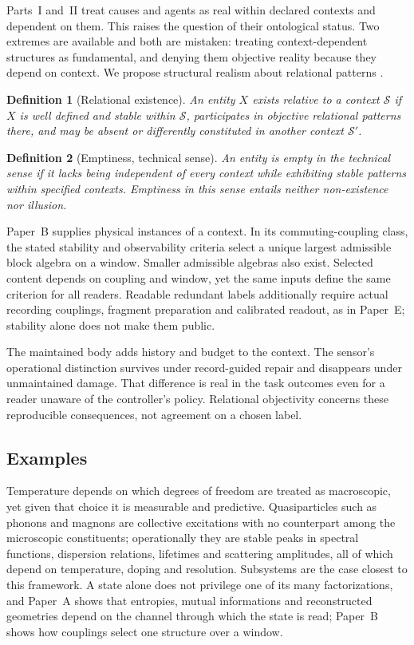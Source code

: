 \documentclass[11pt,a4paper]{article}
\newtheorem{definition}{Definition}[section]
\begin{document}
Parts~I and~II treat causes and agents as real within declared contexts and dependent on them. This raises the question of their ontological status. Two extremes are available and both are mistaken: treating context-dependent structures as fundamental, and denying them objective reality because they depend on context. We propose structural realism about relational patterns \cite{Ladyman2007,French2014}.

\begin{definition}[Relational existence]
\label{def:relational}
An entity $X$ exists relative to a context $\mathcal S$ if $X$ is well defined and stable within $\mathcal S$, participates in objective relational patterns there, and may be absent or differently constituted in another context $\mathcal S'$.
\end{definition}

\begin{definition}[Emptiness, technical sense]
\label{def:empty}
An entity is empty in the technical sense if it lacks being independent of every context while exhibiting stable patterns within specified contexts. Emptiness in this sense entails neither non-existence nor illusion.
\end{definition}

Paper~B supplies physical instances of a context. In its commuting-coupling
class, the stated stability and observability criteria select a unique
largest admissible block algebra on a window. Smaller admissible algebras
also exist. Selected content depends on coupling and window, yet the
same inputs define the same criterion for all readers. Readable redundant
labels additionally require actual recording couplings, fragment preparation
and calibrated readout, as in Paper~E; stability alone does not make them
public.

The maintained body adds history and budget to the context.
The sensor's operational distinction survives under record-guided repair
and disappears under unmaintained damage. That difference is real in the
task outcomes even for a reader unaware of the controller's policy.
Relational objectivity concerns these reproducible consequences, not
agreement on a chosen label.

\subsection{Examples}

Temperature depends on which degrees of freedom are treated as macroscopic, yet given that choice it is measurable and predictive. Quasiparticles such as phonons and magnons are collective excitations with no counterpart among the microscopic constituents; operationally they are stable peaks in spectral functions, dispersion relations, lifetimes and scattering amplitudes, all of which depend on temperature, doping and resolution. Subsystems are the case closest to this framework. A state alone does not privilege one of its many factorizations, and Paper~A shows that entropies, mutual informations and reconstructed geometries depend on the channel through which the state is read; Paper~B shows how couplings select one structure over a window.
\end{document}
